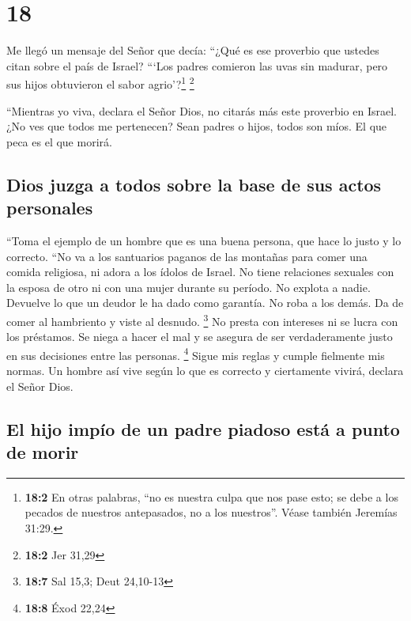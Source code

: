 \hypertarget{section-17}{%
\section{18}\label{section-17}}

 Me llegó un mensaje del Señor que decía: 
``¿Qué es ese proverbio que ustedes citan sobre el país de Israel?
```Los padres comieron las uvas sin madurar, pero sus hijos obtuvieron
el sabor agrio'?\footnote{\textbf{18:2} En otras palabras, ``no es
  nuestra culpa que nos pase esto; se debe a los pecados de nuestros
  antepasados, no a los nuestros''. Véase también Jeremías 31:29.}
\footnote{\textbf{18:2} Jer 31,29}

 ``Mientras yo viva, declara el Señor Dios, no citarás más
este proverbio en Israel.  ¿No ves que todos me
pertenecen? Sean padres o hijos, todos son míos. El que peca es el que
morirá.

\hypertarget{dios-juzga-a-todos-sobre-la-base-de-sus-actos-personales}{%
\subsection{Dios juzga a todos sobre la base de sus actos
personales}\label{dios-juzga-a-todos-sobre-la-base-de-sus-actos-personales}}

 ``Toma el ejemplo de un hombre que es una buena persona,
que hace lo justo y lo correcto.  ``No va a los santuarios
paganos de las montañas para comer una comida religiosa, ni adora a los
ídolos de Israel. No tiene relaciones sexuales con la esposa de otro ni
con una mujer durante su período.  No explota a nadie.
Devuelve lo que un deudor le ha dado como garantía. No roba a los demás.
Da de comer al hambriento y viste al desnudo. \footnote{\textbf{18:7}
  Sal 15,3; Deut 24,10-13}  No presta con intereses ni se
lucra con los préstamos. Se niega a hacer el mal y se asegura de ser
verdaderamente justo en sus decisiones entre las personas. \footnote{\textbf{18:8}
  Éxod 22,24}  Sigue mis reglas y cumple fielmente mis
normas. Un hombre así vive según lo que es correcto y ciertamente
vivirá, declara el Señor Dios.

\hypertarget{el-hijo-impuxedo-de-un-padre-piadoso-estuxe1-a-punto-de-morir}{%
\subsection{El hijo impío de un padre piadoso está a punto de
morir}\label{el-hijo-impuxedo-de-un-padre-piadoso-estuxe1-a-punto-de-morir}}


